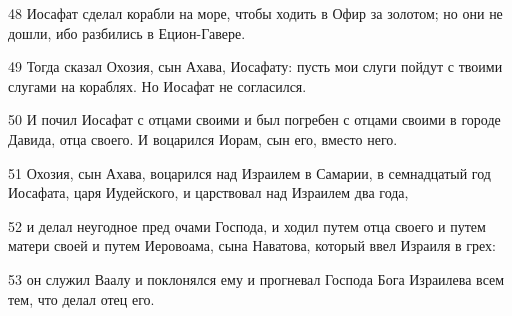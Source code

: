 \par 48 Иосафат сделал корабли на море, чтобы ходить в Офир за золотом; но они не дошли, ибо разбились в Ецион-Гавере.
\par 49 Тогда сказал Охозия, сын Ахава, Иосафату: пусть мои слуги пойдут с твоими слугами на кораблях. Но Иосафат не согласился.
\par 50 И почил Иосафат с отцами своими и был погребен с отцами своими в городе Давида, отца своего. И воцарился Иорам, сын его, вместо него.
\par 51 Охозия, сын Ахава, воцарился над Израилем в Самарии, в семнадцатый год Иосафата, царя Иудейского, и царствовал над Израилем два года,
\par 52 и делал неугодное пред очами Господа, и ходил путем отца своего и путем матери своей и путем Иеровоама, сына Наватова, который ввел Израиля в грех:
\par 53 он служил Ваалу и поклонялся ему и прогневал Господа Бога Израилева всем тем, что делал отец его.


